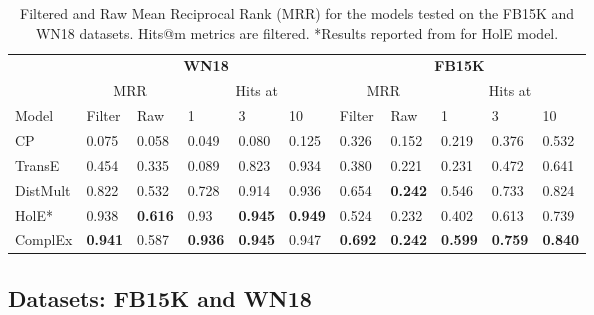 \documentclass{article}
\begin{document}
\begin{table}[t]
    \centering
    \begin{tabular}{@{\extracolsep{8pt}}lllllllllll@{}}
        \toprule
        
         & \multicolumn{5}{c}{\textbf{WN18}} & \multicolumn{5}{c}{\textbf{FB15K}} \\ \cline{2-6} \cline{7-11}
         & \multicolumn{2}{c}{MRR} & \multicolumn{3}{c}{Hits at} & \multicolumn{2}{c}{MRR} & \multicolumn{3}{c}{Hits at} \\ \cline{2-3} \cline{4-6} \cline{7-8} \cline{9-11}
        
        Model & Filter & Raw & 1 & 3 & 10 & Filter & Raw & 1 & 3 & 10 \\ \hline
        
        CP & 0.075 & 0.058 & 0.049 & 0.080 & 0.125 & 0.326 & 0.152 & 0.219 & 0.376 & 0.532 \\
        TransE & 0.454 & 0.335 & 0.089 & 0.823 & 0.934 & 0.380 & 0.221 & 0.231 & 0.472 &  0.641 \\
        DistMult & 0.822 & 0.532 & 0.728 & 0.914 & 0.936 & 0.654 & \textbf{0.242} & 0.546 & 0.733   & 0.824 \\ 
        HolE* & 0.938 & \textbf{0.616} & 0.93 & \textbf{0.945} & \textbf{0.949} & 0.524 & 0.232 & 0.402 & 0.613 & 0.739\\ \hline
        ComplEx & \textbf{0.941} &  0.587 &  \textbf{0.936} &  \textbf{0.945} &  0.947 & \textbf{0.692} & \textbf{0.242} & \textbf{0.599} & \textbf{0.759}   & \textbf{0.840} \\
        
        \bottomrule
    \end{tabular}
    \caption{Filtered and Raw Mean Reciprocal Rank (MRR) for the models tested on the FB15K and WN18 datasets. Hits@m metrics are filtered. *Results reported from \cite{nickel_2016_holographic} for HolE model.}
    \label{tab:fb15k_wn18_res}
\end{table}








\subsection{Datasets: FB15K and WN18}
\end{document}
